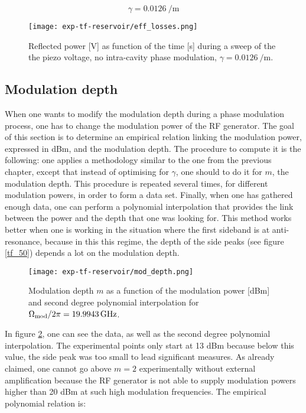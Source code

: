 \begin{equation}
	\gamma = \SI{0.0126}{\per\metre}
\end{equation}

\begin{figure}
	\centering
	\texttt{[image: exp-tf-reservoir/eff\_losses.png]}
	\caption{Reflected power [V] as function of the time [s] during a sweep of the the piezo voltage, no intra-cavity phase modulation, $\gamma = \SI{0.0126}{\per\metre}$.}
	\label{eff-losses}
\end{figure}


\subsection{Modulation depth}

When one wants to modify the modulation depth during a phase modulation process, one has to change the modulation power of the RF generator. The goal of this section is to determine an empirical relation linking the modulation power, expressed in dBm, and the modulation depth. The procedure to compute it is the following: one applies a methodology similar to the one from the previous chapter, except that instead of optimising for $\gamma$, one should to do it for $m$, the modulation depth. This procedure is repeated several times, for different modulation powers, in order to form a data set. Finally, when one has gathered enough data, one can perform a polynomial interpolation that provides the link between the power and the depth that one was looking for. This method works better when one is working in the situation where the first sideband is at anti-resonance, because in this this regime, the depth of the side peaks (see figure \ref{tf_50}) depends a lot on the modulation depth.\\

\begin{figure}
	\centering
	\texttt{[image: exp-tf-reservoir/mod\_depth.png]}
	\caption{Modulation depth $m$ as a function of the modulation power [dBm] and second degree polynomial interpolation for $\Omega_{\text{mod}}/2\pi=\SI{19.9943}{\giga\hertz}$.}
	\label{mod_depth}
\end{figure}

In figure \ref{mod_depth}, one can see the data, as well as the second degree polynomial interpolation. The experimental points only start at 13 dBm because below this value, the side peak was too small to lead significant measures. As already claimed, one cannot go above $m = 2$ experimentally without external amplification because the RF generator is not able to supply modulation powers higher than 20 dBm at such high modulation frequencies. The empirical polynomial relation is:

